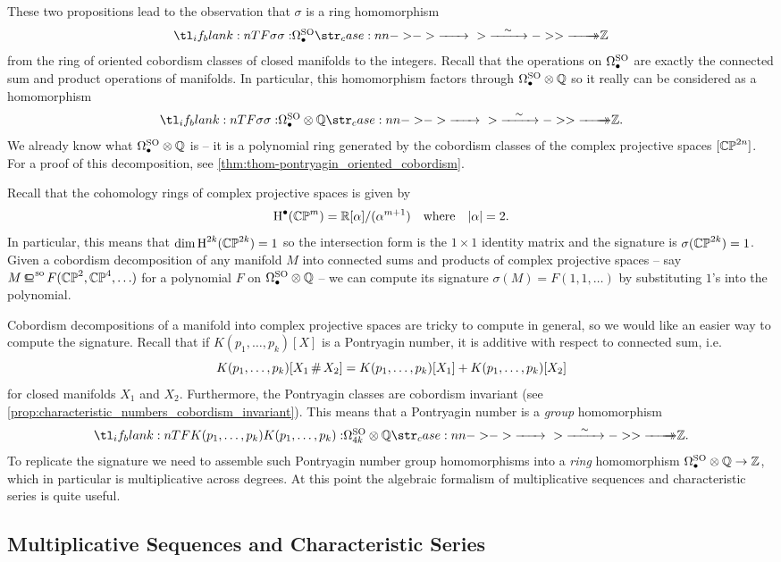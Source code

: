 These two propositions lead to the observation that $\sigma$ is a ring homomorphism
\[
	\lkxfunc{\sigma}{\Omega^\SO_\bullet}{\Z}
\]
from the ring of oriented cobordism classes of closed manifolds to the integers. Recall that the operations on $\Omega^{\operatorname{SO}}_\bullet$ are exactly the connected sum and product operations of manifolds. In particular, this homomorphism factors through $\Omega^{\operatorname{SO}}_\bullet\otimes \mathbb{Q}$ so it really can be considered as a homomorphism
\[
	\lkxfunc{\sigma}{\Omega^\SO_\bullet\otimes \Q}{\Z.}
\]
We already know what $\Omega^{\operatorname{SO}}_\bullet\otimes \mathbb{Q}$ is -- it is a polynomial ring generated by the cobordism classes of the complex projective spaces $[\mathbb{CP}^{2n}]$. For a proof of this decomposition, see \cref{thm:thom-pontryagin_oriented_cobordism}.

Recall that the cohomology rings of complex projective spaces is given by
\[
	\operatorname{H}^\bullet(\mathbb{CP}^{m}) = \mathbb{R}[\alpha]/(\alpha^{m+1})\quad\textrm{where}\quad |\alpha|=2.
\]
In particular, this means that $\dim \operatorname{H}^{2k}(\mathbb{CP}^{2k})=1$ so the intersection form is the $1\times 1$ identity matrix and the signature is $\sigma(\mathbb{CP}^{2k})=1$. Given a cobordism decomposition of any manifold $M$ into connected sums and products of complex projective spaces -- say $M\sobord F(\CP^2,\CP^4,\ldots)$ for a polynomial $F$ on $\Omega^{\operatorname{SO}}_\bullet\otimes \mathbb{Q}$ -- we can compute its signature $\sigma(M)=F(1,1,\ldots)$ by substituting $1$'s into the polynomial.

Cobordism decompositions of a manifold into complex projective spaces are tricky to compute in general, so we would like an easier way to compute the signature.
Recall that if $K(p_1,\ldots, p_k)[X]$ is a Pontryagin number, it is additive with respect to connected sum, i.e.
\[
	K(p_1,\ldots,p_k)[X_1\,\#\, X_2] = K(p_1,\ldots,p_k)[X_1]+K(p_1,\ldots,p_k)[X_2]
\]
for closed manifolds $X_1$ and $X_2$. Furthermore, the Pontryagin classes are cobordism invariant (see \cref{prop:characteristic_numbers_cobordism_invariant}). This means that a Pontryagin number is a \emph{group} homomorphism
\[
	\lkxfunc{K(p_1,\ldots,p_k)}{\Omega^\SO_{4k}\otimes \Q}{\Z.}
\]
To replicate the signature we need to assemble such Pontryagin number group homomorphisms into a \emph{ring} homomorphism $\Omega^{\operatorname{SO}}_\bullet\otimes \mathbb{Q}\to \mathbb{Z}$, which in particular is multiplicative across degrees. At this point the algebraic formalism of multiplicative sequences and characteristic series is quite useful.

\subsection*{Multiplicative Sequences and Characteristic Series}

